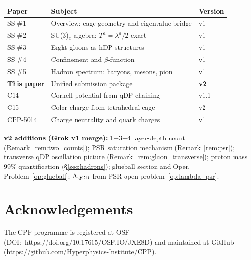 \documentclass[11pt,letterpaper]{article}
\begin{document}
\begin{table}[H]
\centering
\begin{tabular}{@{}lll@{}}
\toprule
Paper & Subject & Version \\
\midrule
SS \#1 \citep{cpp_ss1} & Overview: cage geometry and eigenvalue bridge & v1 \\
SS \#2 \citep{cpp_ss2} & SU(3)$_c$ algebra: $T^a=\lambda^a/2$ exact & v1 \\
SS \#3 \citep{cpp_ss3} & Eight gluons as hDP structures & v1 \\
SS \#4 \citep{cpp_ss4} & Confinement and $\beta$-function & v1 \\
SS \#5 \citep{cpp_ss5} & Hadron spectrum: baryons, mesons, pion & v1 \\
\textbf{This paper} & Unified submission package & \textbf{v2} \\
\midrule
C14 \citep{c14} & Cornell potential from qDP chaining & v1.1 \\
C15 \citep{c15} & Color charge from tetrahedral cage & v2 \\
CPP-5014 \citep{cpp5014} & Charge neutrality and quark charges & v1 \\
\bottomrule
\end{tabular}
\end{table}
\smallskip
\noindent\textbf{v2 additions (Grok v1 merge):} 1+3+4 layer-depth
count (Remark~\ref{rem:two_counts}); PSR saturation mechanism
(Remark~\ref{rem:psr}); transverse qDP oscillation picture
(Remark~\ref{rem:gluon_transverse}); proton mass 99\% quantification
(\S\ref{sec:hadrons}); glueball section and Open
Problem~\ref{op:glueball}; $\Lambda_{\rm QCD}$ from PSR open
problem~\ref{op:lambda_psr}.





\section*{Acknowledgements}
The CPP programme is registered at OSF (DOI:~\url{https://doi.org/10.17605/OSF.IO/JXE8D}) and maintained at GitHub (\url{https://github.com/Hyperphysics-Institute/CPP}).
\end{document}
